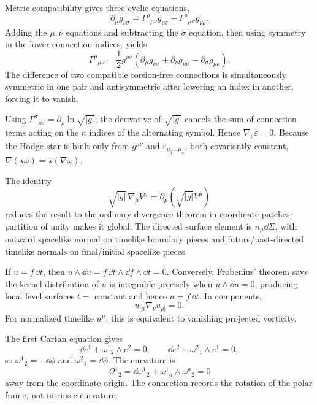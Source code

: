 \begin{solution}
Metric compatibility gives three cyclic equations,
\[
\partial_\mu g_{\nu\sigma}
=\Gamma^\rho{}_{\mu\nu}g_{\rho\sigma}
+\Gamma^\rho{}_{\mu\sigma}g_{\nu\rho}.
\]
Adding the \(\mu,\nu\) equations and subtracting the \(\sigma\) equation, then
using symmetry in the lower connection indices, yields
\[
\Gamma^\rho{}_{\mu\nu}
=\frac12g^{\rho\sigma}
(\partial_\mu g_{\nu\sigma}+\partial_\nu g_{\mu\sigma}
-\partial_\sigma g_{\mu\nu}).
\]
The difference of two compatible torsion-free connections is simultaneously
symmetric in one pair and antisymmetric after lowering an index in another,
forcing it to vanish.
\end{solution}

\begin{solution}
Using
\(\Gamma^\sigma{}_{\rho\sigma}=\partial_\rho\ln\sqrt{|g|}\), the derivative
of \(\sqrt{|g|}\) cancels the sum of connection terms acting on the \(n\)
indices of the alternating symbol.  Hence \(\nabla_\rho\varepsilon=0\).
Because the Hodge star is built only from \(g^{\mu\nu}\) and
\(\varepsilon_{\mu_1\ldots\mu_n}\), both covariantly constant,
\(\nabla(\star\omega)=\star(\nabla\omega)\).
\end{solution}

\begin{solution}
The identity
\[
\sqrt{|g|}\,\nabla_\mu V^\mu
=\partial_\mu(\sqrt{|g|}V^\mu)
\]
reduces the result to the ordinary divergence theorem in coordinate patches;
partition of unity makes it global.  The directed surface element is
\(n_\mu\dd\Sigma\), with outward spacelike normal on timelike boundary pieces
and future/past-directed timelike normals on final/initial spacelike pieces.
\end{solution}

\begin{solution}
If \(u=f\,\dd t\), then \(u\wedge\dd u=f\,\dd t\wedge\dd f\wedge\dd t=0\).
Conversely, Frobenius' theorem says the kernel distribution of \(u\) is
integrable precisely when \(u\wedge\dd u=0\), producing local level surfaces
\(t=\) constant and hence \(u=f\,\dd t\).  In components,
\[
u_{[\mu}\nabla_\nu u_{\rho]}=0.
\]
For normalized timelike \(u^\mu\), this is equivalent to vanishing projected
vorticity.
\end{solution}

\begin{solution}
The first Cartan equation gives
\[
\dd e^1+\omega^1{}_2\wedge e^2=0,\qquad
\dd e^2+\omega^2{}_1\wedge e^1=0,
\]
so \(\omega^1{}_2=-\dd\phi\) and
\(\omega^2{}_1=\dd\phi\).  The curvature is
\[
\Omega^1{}_2=\dd\omega^1{}_2
+\omega^1{}_a\wedge\omega^a{}_2=0
\]
away from the coordinate origin.  The connection records the rotation of the
polar frame, not intrinsic curvature.
\end{solution}


